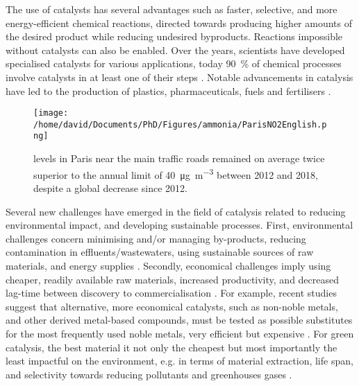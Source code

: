The use of catalysts has several advantages such as faster, selective, and more energy-efficient chemical reactions, directed towards producing higher amounts of the desired product while reducing undesired byproducts.
Reactions impossible without catalysts can also be enabled.
Over the years, scientists have developed specialised catalysts for various applications, today \qty{90}{\percent} of chemical processes involve catalysts in at least one of their steps \parencite{Weiner1998, DeVries2012}.
Notable advancements in catalysis have led to the production of plastics, pharmaceuticals, fuels and fertilisers \parencite{Fechete2012}.

\begin{figure}[!htb]
    \centering
    \texttt{[image: /home/david/Documents/PhD/Figures/ammonia/ParisNO2English.png]}
    \caption{
         levels in Paris near the main traffic roads remained on average twice superior to the annual limit of \qty{40}{\ug \per \m^3} \parencite{AirParis} between 2012 and 2018, despite a global decrease since 2012.
    }
    \label{fig:NO2Paris}
\end{figure}

Several new challenges have emerged in the field of catalysis related to reducing environmental impact, and developing sustainable processes.
First, environmental challenges concern minimising and/or managing by-products, reducing contamination in effluents/wastewaters, using sustainable sources of raw materials, and energy supplies \parencite{Ludwig2017, Lange2021}.
Secondly, economical challenges imply using cheaper, readily available raw materials, increased productivity, and decreased lag-time between discovery to commercialisation \parencite{Keisuke2019, Gunay2021}.
For example, recent studies suggest that alternative, more economical catalysts, such as non-noble metals, and other derived metal-based compounds, must be tested as possible substitutes for the most frequently used noble metals, very efficient but expensive \parencite{Zhong2021, Ruan2022}.
For green catalysis, the best material it not only the cheapest but most importantly the least impactful on the environment, e.g. in terms of material extraction, life span, and selectivity towards reducing pollutants and greenhouses gases \parencite{Lange2021}.

